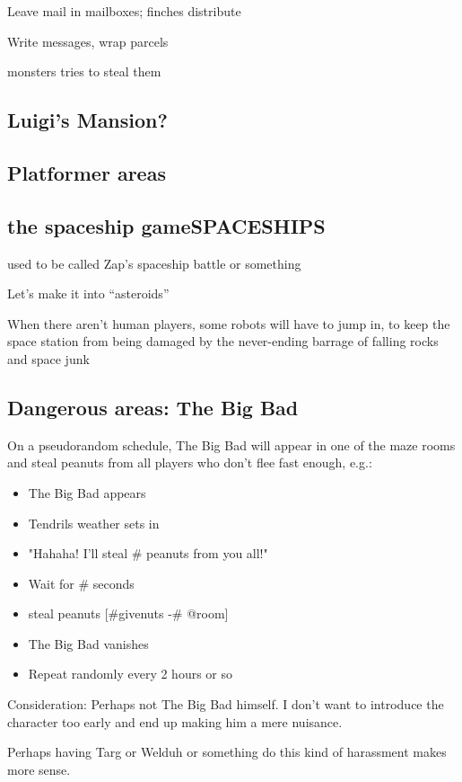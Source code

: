 \documentclass[11pt]{article}
\begin{document}
Leave mail in mailboxes; finches distribute

Write messages, wrap parcels

monsters tries to steal them
\subsection{Luigi's Mansion?}
\label{sec-3-10}
\subsection{Platformer areas}
\label{sec-3-11}
\subsection{the spaceship game\hfill{}\textsc{SPACESHIPS}}
\label{sec-3-12}

used to be called Zap's spaceship battle or something

Let's make it into “asteroids”

When there aren't human players, some robots will have to jump in, to
keep the space station from being damaged by the never-ending barrage
of falling rocks and space junk
\subsection{Dangerous areas: The Big Bad}
\label{sec-3-13}

On a pseudorandom schedule, The Big Bad will appear in one of the maze
rooms and steal peanuts from all players who don't flee fast
enough, e.g.:

\begin{itemize}
\item The Big Bad appears
\item Tendrils weather sets in
\item "Hahaha! I'll steal \# peanuts from you all!"
\item Wait for \# seconds
\item steal peanuts [\#givenuts -\# @room]
\item The Big Bad vanishes
\item Repeat randomly every 2 hours or so
\end{itemize}

Consideration: Perhaps not The Big Bad himself. I don't want to introduce
the character too early and end up making him a mere nuisance.

Perhaps having Targ or Welduh or something do this kind of harassment
makes more sense.
\end{document}
